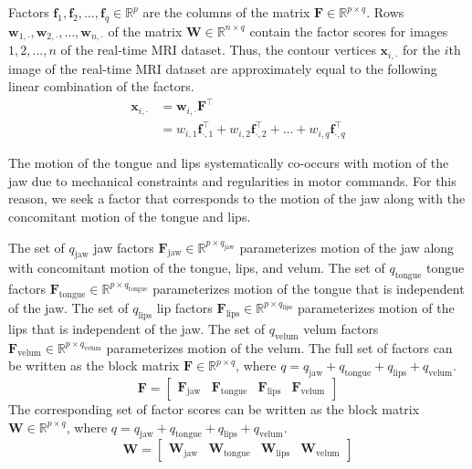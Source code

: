 \documentclass[preprint]{JASAnew}
\begin{document}
Factors $\mathbf{f}_1, \mathbf{f}_2, \ldots, \mathbf{f}_q \in \mathbb{R}^p$ are the columns of the matrix $\mathbf{F} \in \mathbb{R}^{p\times q}$. 
%
Rows $\mathbf{w}_{1,\cdot},\mathbf{w}_{2,\cdot},\ldots,\mathbf{w}_{n,\cdot}$ of the matrix $\mathbf{W} \in \mathbb{R}^{n\times q}$ contain the factor scores for images $1,2,\ldots,n$ of the real-time MRI dataset. 
%
Thus, the contour vertices $\mathbf{x}_{i,\cdot}$ for the $i$th image of the real-time MRI dataset are approximately equal to the following linear combination of the factors. 
%
\begin{align}
\label{eq:linearcombo}
\mathbf{x}_{i,\cdot}
 &=
  \mathbf{w}_{i,\cdot} \mathbf{F}^\intercal \\
 &=
  w_{i,1} \mathbf{f}_{\cdot,1}^\intercal
  + w_{i,2} \mathbf{f}_{\cdot,2}^\intercal
  + \ldots
  + w_{i,q} \mathbf{f}_{\cdot,q}^\intercal
\end{align}




The motion of the tongue and lips systematically co-occurs with motion of the jaw due to mechanical constraints and regularities in motor commands. For this reason, we seek a factor that corresponds to the motion of the jaw along with the concomitant motion of the tongue and lips.


The set of $q_\text{jaw}$ jaw factors $\mathbf{F}_\text{jaw} \in \mathbb{R}^{p\times q_\text{jaw}}$ parameterizes motion of the jaw along with concomitant motion of the tongue, lips, and velum.
%
The set of $q_\text{tongue}$ tongue factors $\mathbf{F}_\text{tongue} \in \mathbb{R}^{p\times q_\text{tongue}}$ parameterizes motion of the tongue that is independent of the jaw. 
%
The set of $q_\text{lips}$ lip factors $\mathbf{F}_\text{lips} \in \mathbb{R}^{p\times q_\text{lips}}$ parameterizes motion of the lips that is independent of the jaw.
%
The set of $q_\text{velum}$ velum factors $\mathbf{F}_\text{velum} \in \mathbb{R}^{p\times q_\text{velum}}$ parameterizes motion of the velum.
%
The full set of factors can be written as the block matrix $\mathbf{F} \in \mathbb{R}^{p\times q}$, where $q=q_\text{jaw}+q_\text{tongue}+q_\text{lips}+q_\text{velum}$. 
% 
\begin{equation}
\label{eq:Fblock}
\mathbf{F} = 
\left[
\begin{array}{c|c|c|c}
\mathbf{F}_\text{jaw} 
& \mathbf{F}_\text{tongue}
& \mathbf{F}_\text{lips}
& \mathbf{F}_\text{velum}
\end{array}
\right]
\end{equation}
%
The corresponding set of factor scores can be written as the block matrix $\mathbf{W} \in \mathbb{R}^{p\times q}$, where $q=q_\text{jaw}+q_\text{tongue}+q_\text{lips}+q_\text{velum}$. 
% 
\begin{equation}
\label{eq:Wblock}
\mathbf{W} = 
\left[
\begin{array}{c|c|c|c}
\mathbf{W}_\text{jaw} 
& \mathbf{W}_\text{tongue}
& \mathbf{W}_\text{lips}
& \mathbf{W}_\text{velum}
\end{array}
\right]
\end{equation}
\end{document}
